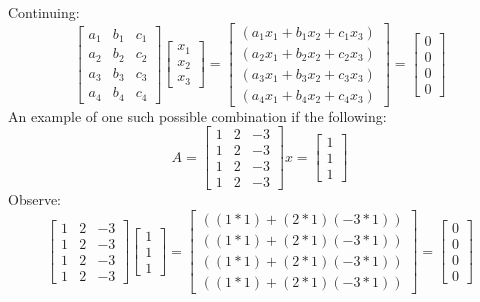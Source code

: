 \documentclass[11pt]{article}
\theoremstyle{plain}
\begin{document}
Continuing:
\[
	\begin{bmatrix}
		a_1 & b_1 & c_1 \\
		a_2 & b_2 & c_2 \\
		a_3 & b_3 & c_3 \\
		a_4 & b_4 & c_4
	\end{bmatrix}
	\begin{bmatrix}
		x_1 \\ x_2 \\ x_3
	\end{bmatrix}
	= \begin{bmatrix}
		(a_1x_1 + b_1x_2 + c_1x_3) \\
		(a_2x_1 + b_2x_2 + c_2x_3) \\
		(a_3x_1 + b_3x_2 + c_3x_3) \\
		(a_4x_1 + b_4x_2 + c_4x_3)
	\end{bmatrix}
	= \begin{bmatrix}
		0 \\ 0 \\ 0 \\ 0
	\end{bmatrix}
\]
An example of one such possible combination if the following:
\[
	A = \begin{bmatrix}
		1 & 2 & -3 \\
		1 & 2 & -3 \\
		1 & 2 & -3 \\
		1 & 2 & -3
	\end{bmatrix}
	x = \begin{bmatrix}
		1 \\ 1 \\ 1
	\end{bmatrix}
\]
Observe:
\[
	\begin{bmatrix}
		1 & 2 & -3 \\
		1 & 2 & -3 \\
		1 & 2 & -3 \\
		1 & 2 & -3
	\end{bmatrix}
	\begin{bmatrix}
		1 \\ 1 \\ 1
	\end{bmatrix} =
	\begin{bmatrix}
		((1*1) + (2*1) (-3*1)) \\
		((1*1) + (2*1) (-3*1)) \\
		((1*1) + (2*1) (-3*1)) \\
		((1*1) + (2*1) (-3*1))
	\end{bmatrix}
	= \begin{bmatrix}
		0 \\ 0 \\ 0 \\ 0
	\end{bmatrix}
\]
\end{document}
